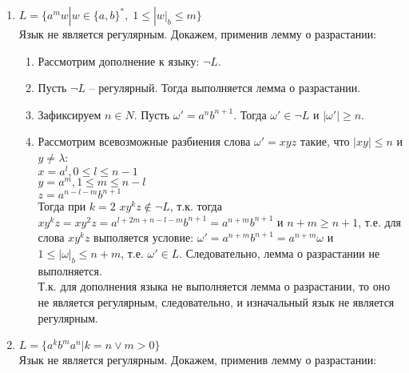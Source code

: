 \documentclass{article}
\begin{document}
\begin{enumerate}
    \item \(L = \{a^{m}w | w \in \{a, b\}^{*}, \; 1 \leq |w|_b \leq m\}\) \\
        Язык не является регулярным. Докажем, применив лемму о разрастании:
    \begin{enumerate}
        \item Рассмотрим дополнение к языку: \(\neg L\).
        \item Пусть \(\neg L\) – регулярный. Тогда выполняется лемма о разрастании.
        \item Зафиксируем \(n \in N\). Пусть \(\omega' = a^{n}b^{n + 1}\). Тогда \(\omega' \in \neg L\) и \(|\omega'| \geq n\).
        \item Рассмотрим всевозможные разбиения слова \(\omega' = xyz\) такие, что \(|xy| \leq n\) и \(y \neq \lambda\):\\
        \(x = a^{l}, 0 \leq l \leq n - 1\)\\
        \(y = a^{m}, 1 \leq m \leq n - l\)\\
        \(z = a^{n - l - m}b^{n + 1}\)\\
        Тогда при \(k = 2\) \(xy^{k}z \notin \neg L\), т.к. тогда \(xy^{k}z = xy^{2}z = a^{l + 2m + n - l - m}b^{n + 1} = a^{n + m}b^{n + 1}\) и \(n + m \geq n + 1\), т.е. для слова \(xy^{k}z\) выполяется условие: \(\omega' = a^{n + m}b^{n + 1} = a^{n + m}\omega\) и \(1 \leq |\omega|_b \leq n + m\), т.е. \(\omega' \in L\). Следовательно, лемма о разрастании не выполняется.\\
        Т.к. для дополнения языка не выполняется лемма о разрастании, то оно не является регулярным, следовательно, и изначальный язык не является регулярным.
    \end{enumerate}
    
    \item \(L = \{a^{k}b^{m}a^{n} | k = n \vee m > 0\}\) \\
        Язык не является регулярным. Докажем, применив лемму о разрастании:
    \begin{enumerate}
        
    \end{enumerate}
    

\end{enumerate}
\end{document}
